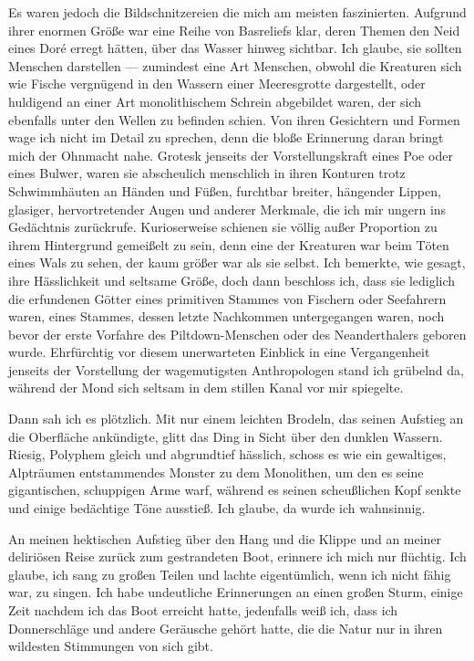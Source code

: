 \documentclass[a4paper]{memoir}
\begin{document}
Es waren jedoch die Bildschnitzereien die mich am meisten faszinierten. Aufgrund ihrer enormen Größe war eine Reihe von Basreliefs klar, deren Themen den Neid eines Doré erregt hätten, über das Wasser hinweg sichtbar. Ich glaube, sie sollten Menschen darstellen --- zumindest eine Art Menschen, obwohl die Kreaturen sich wie Fische vergnügend in den Wassern einer Meeresgrotte dargestellt, oder huldigend an einer Art monolithischem Schrein abgebildet waren, der sich ebenfalls unter den Wellen zu befinden schien. Von ihren Gesichtern und Formen wage ich nicht im Detail zu sprechen, denn die bloße Erinnerung daran bringt mich der Ohnmacht nahe. Grotesk jenseits der Vorstellungskraft eines Poe oder eines Bulwer, waren sie abscheulich menschlich in ihren Konturen trotz Schwimmhäuten an Händen und Füßen, furchtbar breiter, hängender Lippen, glasiger, hervortretender Augen und anderer Merkmale, die ich mir ungern ins Gedächtnis zurückrufe. Kurioserweise schienen sie völlig außer Proportion zu ihrem Hintergrund gemeißelt zu sein, denn eine der Kreaturen war beim Töten eines Wals zu sehen, der kaum größer war als sie selbst. Ich bemerkte, wie gesagt, ihre Hässlichkeit und seltsame Größe, doch dann beschloss ich, dass sie lediglich die erfundenen Götter eines primitiven Stammes von Fischern oder Seefahrern waren, eines Stammes, dessen letzte Nachkommen untergegangen waren, noch bevor der erste Vorfahre des Piltdown-Menschen oder des Neanderthalers geboren wurde. Ehrfürchtig vor diesem unerwarteten Einblick in eine Vergangenheit jenseits der Vorstellung der wagemutigsten Anthropologen stand ich grübelnd da, während der Mond sich seltsam in dem stillen Kanal vor mir spiegelte.

Dann sah ich es plötzlich. Mit nur einem leichten Brodeln, das seinen Aufstieg an die Oberfläche ankündigte, glitt das Ding in Sicht über den dunklen Wassern. Riesig, Polyphem gleich und abgrundtief hässlich, schoss es wie ein gewaltiges, Alpträumen entstammendes Monster zu dem Monolithen, um den es seine gigantischen, schuppigen Arme warf, während es seinen scheußlichen Kopf senkte und einige bedächtige Töne ausstieß. Ich glaube, da wurde ich wahnsinnig.

An meinen hektischen Aufstieg über den Hang und die Klippe und an meiner deliriösen Reise zurück zum gestrandeten Boot, erinnere ich mich nur flüchtig. Ich glaube, ich sang zu großen Teilen und lachte eigentümlich, wenn ich nicht fähig war, zu singen. Ich habe undeutliche Erinnerungen an einen großen Sturm, einige Zeit nachdem ich das Boot erreicht hatte, jedenfalls weiß ich, dass ich Donnerschläge und andere Geräusche gehört hatte, die die Natur nur in ihren wildesten Stimmungen von sich gibt.
\end{document}

